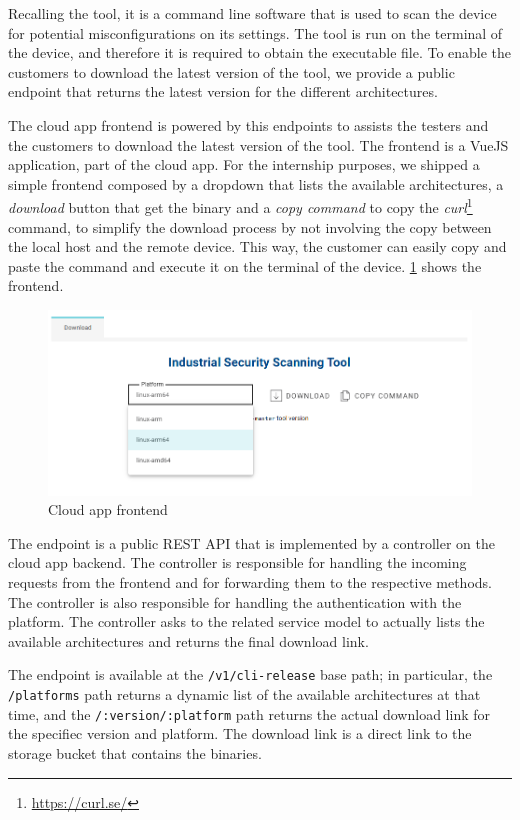 Recalling the tool, it is a command line software that is used to scan the device for potential misconfigurations on its settings. The tool is run on the terminal of the device, and therefore it is required to obtain the executable file. To enable the customers to download the latest version of the tool, we provide a public endpoint that returns the latest version for the different architectures.

The cloud app frontend is powered by this endpoints to assists the testers and the customers to download the latest version of the tool. The frontend is a VueJS application, part of the cloud app. For the internship purposes, we shipped a simple frontend composed by a dropdown that lists the available architectures, a \textit{download} button that get the binary and a \textit{copy command} to copy the \textit{curl}\footnote{\url{https://curl.se/}} command, to simplify the download process by not involving the copy between the local host and the remote device. This way, the customer can easily copy and paste the command and execute it on the terminal of the device. \cref{fig:cloud-app-frontend} shows the frontend.

\begin{figure}[h]
  \centering
  \includegraphics[width=1.0\textwidth]{chapters/05/assets/cloud-app-frontend}
  \caption{Cloud app frontend}
  \label{fig:cloud-app-frontend}
\end{figure}

The endpoint is a public REST API that is implemented by a controller on the cloud app backend. The controller is responsible for handling the incoming requests from the frontend and for forwarding them to the respective methods. The controller is also responsible for handling the authentication with the platform. The controller asks to the related service model to actually lists the available architectures and returns the final download link.

The endpoint is available at the \texttt{/v1/cli-release} base path; in particular, the \texttt{/platforms} path returns a dynamic list of the available architectures at that time, and the \texttt{/:version/:platform} path returns the actual download link for the specifiec version and platform. The download link is a direct link to the storage bucket that contains the binaries.

